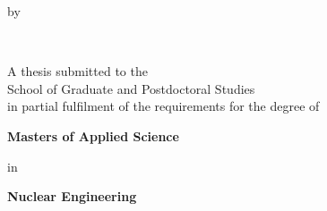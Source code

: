 \begin{titlepage}

%
%
%
%
%
%
\thispagestyle{empty}

\begin{center}


\vspace*{2\bigskipamount}

{\makeatletter
{}\LARGE\@title
\makeatother}

{\makeatletter
\ifx\@subtitle\undefined\else
    \bigskip
    \Large\@subtitle
\fi
\makeatother}



\bigskip
\bigskip
\bigskip
\bigskip
\bigskip
\bigskip

by

\bigskip
\bigskip

\makeatletter
{\bf \@firstname\ {\@lastname}}
\makeatother

\bigskip
\bigskip
\bigskip
\bigskip

A thesis submitted to the\\
School of Graduate and Postdoctoral Studies\\
in partial fulfilment of the requirements for the degree of 

\bigskip
\bigskip
\bigskip
\bigskip

{\bf{Masters of Applied Science}}


in


{\bf{Nuclear Engineering}}


\end{center}
\end{titlepage}
